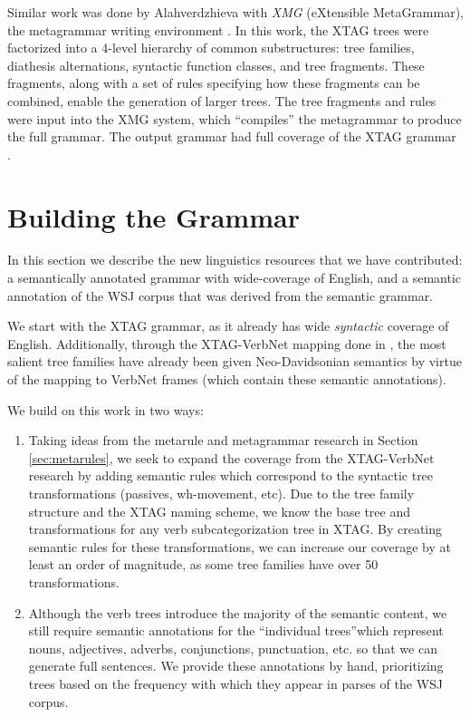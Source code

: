 \documentclass[11pt,a4paper]{article}
\begin{document}
Similar work was done by Alahverdzhieva with {\em XMG} (eXtensible MetaGrammar),
the metagrammar writing environment \cite{alahverdzhieva2008xtag}.  In this
work, the XTAG trees were factorized into a 4-level hierarchy of common
substructures:  tree families, diathesis alternations, syntactic function
classes, and tree fragments. These fragments, along with a set of rules
specifying how these fragments can be combined, enable the generation of larger
trees. The tree fragments and rules were input into the XMG system, which
``compiles'' the metagrammar to produce the full grammar. The output grammar had
full coverage of the XTAG grammar \cite{alahverdzhieva2008xtag}.

\section{Building the Grammar}

In this section we describe the new linguistics resources that we have contributed: 
a semantically annotated grammar with wide-coverage of English, and a semantic annotation of
the WSJ corpus that was derived from the semantic grammar. 

We start with the XTAG grammar, as it already has wide {\em syntactic} coverage 
of English. Additionally, through the XTAG-VerbNet mapping done in \cite{ryant2004assigning},
the most salient tree families have already been given Neo-Davidsonian semantics
by virtue of the mapping to VerbNet frames (which contain these semantic annotations). 

We build on this work in two ways:

\begin{enumerate}

    \item Taking ideas from the metarule and metagrammar research in Section \ref{sec:metarules}, we seek to expand the coverage from the XTAG-VerbNet research by adding semantic rules which correspond to the syntactic tree transformations (passives, wh-movement, etc). Due to the tree family structure and the XTAG naming scheme, we know the base tree and transformations for any verb subcategorization tree in XTAG. By creating semantic rules for these transformations, we can increase our coverage by at least an order of magnitude, as some tree families have over 50 transformations.

    \item Although the verb trees introduce the majority of the semantic content, we still require semantic annotations for the ``individual trees''which represent nouns, adjectives, adverbs, conjunctions, punctuation, etc. so that we can generate full sentences. We provide these annotations by hand, prioritizing trees based on the frequency with which they appear in parses of the WSJ corpus.

\end{enumerate}
\end{document}
